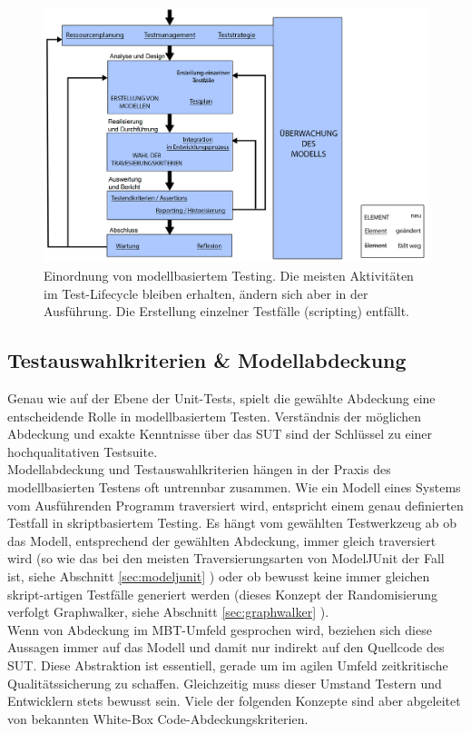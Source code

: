 \begin{figure}[h] 
  \centering
     \includegraphics[width=1.0\textwidth]{figures/mbt_vergleich_skript.png}
  \caption{Einordnung von modellbasiertem Testing. Die meisten Aktivitäten im Test-Lifecycle bleiben erhalten, ändern sich aber in der Ausführung. Die Erstellung einzelner Testfälle (scripting) entfällt.}
  \label{fig:script_vs_mbt}
\end{figure}

\subsection{Testauswahlkriterien \& Modellabdeckung}
\label{sec:coverage}

Genau wie auf der Ebene der Unit-Tests, spielt die gewählte Abdeckung eine entscheidende Rolle in modellbasiertem Testen. Verständnis der möglichen Abdeckung und exakte Kenntnisse über das SUT sind der Schlüssel zu einer hochqualitativen Testsuite.\\
Modellabdeckung und Testauswahlkriterien hängen in der Praxis des modellbasierten Testens oft untrennbar zusammen. Wie ein Modell eines Systems vom Ausführenden Programm traversiert wird, entspricht einem genau definierten Testfall in skriptbasiertem Testing. Es hängt vom gewählten Testwerkzeug ab ob das Modell, entsprechend der gewählten Abdeckung, immer gleich traversiert wird (so wie das bei den meisten Traversierungsarten von ModelJUnit der Fall ist, siehe Abschnitt \ref{sec:modeljunit} ) oder ob bewusst keine immer gleichen skript-artigen Testfälle generiert werden (dieses Konzept der Randomisierung verfolgt Graphwalker, siehe Abschnitt \ref{sec:graphwalker} ).\\
Wenn von Abdeckung im MBT-Umfeld gesprochen wird, beziehen sich diese Aussagen immer auf das Modell und damit nur indirekt auf den Quellcode des SUT. Diese Abstraktion ist essentiell, gerade um im agilen Umfeld zeitkritische Qualitätssicherung zu schaffen.\cite{utting_practical_2007} Gleichzeitig muss dieser Umstand Testern und Entwicklern stets bewusst sein. Viele der folgenden Konzepte sind aber abgeleitet von bekannten White-Box Code-Abdeckungskriterien.

